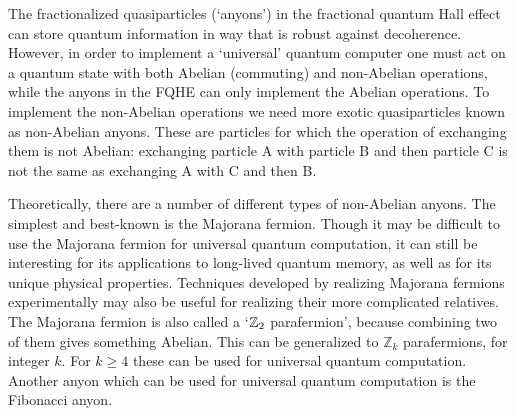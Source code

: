 The fractionalized quasiparticles (`anyons') in the fractional quantum Hall effect can store quantum information in way that is robust against decoherence. However, in order to implement a `universal' quantum computer one must act on a quantum state with both Abelian (commuting) and non-Abelian operations,\cite{FreedmanUniversal} while the anyons in the FQHE can only implement the Abelian operations. To implement the non-Abelian operations we need more exotic quasiparticles known as non-Abelian anyons. These are particles for which the operation of exchanging them is not Abelian: exchanging particle A with particle B and then particle C is not the same as exchanging A with C and then B. 

Theoretically, there are a number of different types of non-Abelian anyons. The simplest and best-known is the Majorana fermion. Though it may be difficult to use the Majorana fermion for universal quantum computation,\cite{FuMajorana} it can still be interesting for its applications to long-lived quantum memory\cite{KitaevWireMajorana:01}, as well as for its unique physical properties. Techniques developed by realizing Majorana fermions experimentally may also be useful for realizing their more complicated relatives. The Majorana fermion is also called a `$\mathbb{Z}_2$ parafermion', because combining two of them gives something Abelian. This can be generalized to $\mathbb{Z}_k$ parafermions, for integer $k$. For $k\ge 4$ these can be used for universal quantum computation\cite{FreedmanUniversal,CuiWang}. Another anyon which can be used for universal quantum computation is the Fibonacci anyon.

